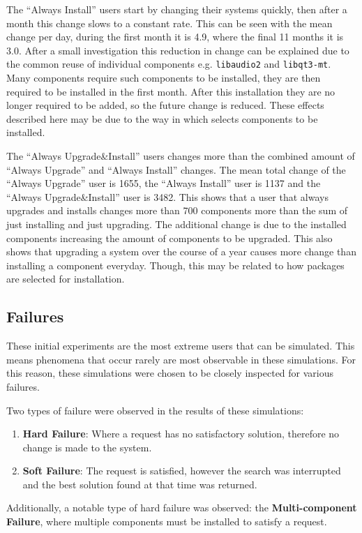 The ``Always Install'' users start by changing their systems quickly, then after a month this change slows to a constant rate.
This can be seen with the mean change per day, during the first month it is 4.9, where the final 11 months it is 3.0.
After a small investigation this reduction in change can be explained due to the common reuse of individual components e.g. \texttt{libaudio2} and \texttt{libqt3-mt}.
Many components require such components to be installed, they are then required to be installed in the first month.
After this installation they are no longer required to be added, so the future change is reduced. 
These effects described here may be due to the way in which \usermodel selects components to be installed.

The ``Always Upgrade\&Install'' users changes more than the combined amount of ``Always Upgrade'' and ``Always Install'' changes.
The mean total change of the ``Always Upgrade'' user is 1655, the ``Always Install'' user is 1137 and the ``Always Upgrade\&Install'' user is 3482.
This shows that a user that always upgrades and installs changes more than 700 components more than the sum of just installing and just upgrading.
The additional change is due to the installed components increasing the amount of components to be upgraded.
This also shows that upgrading a system over the course of a year causes more change than installing a component everyday.
Though, this may be related to how packages are selected for installation.

\subsection{Failures}
These initial experiments are the most extreme users that can be simulated.
This means phenomena that occur rarely are most observable in these simulations.
For this reason, these simulations were chosen to be closely inspected for various failures.

Two types of failure were observed in the results of these simulations:
\begin{enumerate}
  \item \textbf{Hard Failure}: Where a request has no satisfactory solution, therefore no change is made to the system.
  \item \textbf{Soft Failure}: The request is satisfied, however the search was interrupted and the best solution found at that time was returned.
\end{enumerate}
Additionally, a notable type of hard failure was observed: the \textbf{Multi-component Failure}, where multiple components must be installed to satisfy a request. 

